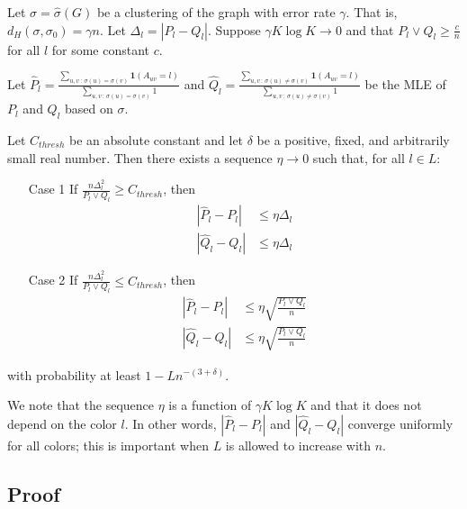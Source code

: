 \documentclass{article}
\begin{document}
\begin{proposition}
\label{prop:estimation_consistency}
Let $\sigma = \hat{\sigma}(G)$ be a clustering of the graph with error rate $\gamma$. That is, $d_H(\sigma, \sigma_0) = \gamma n$. Let $\Delta_l = | P_l - Q_l |$. Suppose $\gamma K \log K \rightarrow 0$ and that $P_l \vee Q_l \geq \frac{c}{n}$ for all $l$ for some constant $c$. 


Let $\hat{P}_l = \frac{\sum_{u,v \,:\, \sigma(u)=\sigma(v)} \mathbf{1}(A_{uv} = l) }
                      {\sum_{u,v \,:\, \sigma(u) = \sigma(v)} 1}$ and
    $\hat{Q}_l = \frac{\sum_{u,v \,:\, \sigma(u) \neq \sigma(v)} \mathbf{1}(A_{uv} = l) }
                      {\sum_{u,v \,:\, \sigma(u) \neq \sigma(v)} 1}$ be the MLE of $P_l$ and $Q_l$ based on $\sigma$. 

Let $C_{thresh}$ be an absolute constant and let $\delta$ be a positive, fixed, and arbitrarily small real number. Then there exists a sequence $\eta \rightarrow 0$ such that, for all $l \in L$:

\begin{itemize}
\item[Case 1] If $\frac{n \Delta_l^2}{P_l \vee Q_l} \geq C_{thresh}$, then
\begin{align*}
 | \hat{P}_l - P_l | &\leq \eta \Delta_l \\
 | \hat{Q}_l - Q_l | &\leq \eta \Delta_l 
\end{align*}
\item[Case 2] If $\frac{n \Delta_l^2}{P_l \vee Q_l} \leq C_{thresh}$, then
\begin{align*}
 | \hat{P}_l - P_l | &\leq \eta \sqrt{ \frac{P_l \vee Q_l}{n}} \\
 | \hat{Q}_l - Q_l | &\leq \eta \sqrt{ \frac{P_l \vee Q_l}{n}}
\end{align*}
\end{itemize}

with probability at least $1 - L n^{-(3 + \delta)}$. 
\end{proposition}

We note that the sequence $\eta$ is a function of $\gamma K \log K$ and that it does not depend on the color $l$. In other words, $| \hat{P}_l - P_l |$ and $|\hat{Q}_l - Q_l|$ converge uniformly for all colors; this is important when $L$ is allowed to increase with $n$. 


\subsection{Proof} 
\end{document}
